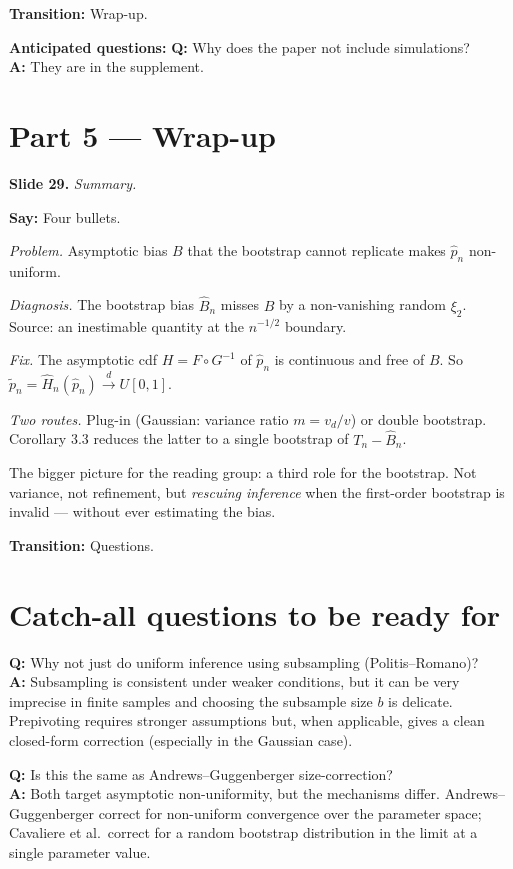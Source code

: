\documentclass[11pt]{article}
\theoremstyle{definition}
\newcommand{\dto}{\xrightarrow{d}}
\newcommand{\Tn}{T_{n}}
\newcommand{\Bnh}{\hat{B}_{n}}
\newcommand{\pnh}{\hat{p}_{n}}
\newcommand{\pnt}{\tilde{p}_{n}}
\newcommand{\Hnh}{\hat{H}_{n}}
\newcommand{\slide}[2]{%
  \medskip
  \noindent\colorbox{soft}{\parbox{\linewidth}{\textbf{Slide #1.} \textit{#2}}}
  \medskip
}
\newcommand{\say}[1]{\textbf{Say:} #1}
\newcommand{\trans}[1]{\textbf{Transition:} #1}
\newcommand{\Q}[2]{\noindent\textcolor{warn}{\textbf{Q:}} #1\\ \textcolor{accent}{\textbf{A:}} #2\par\smallskip}
\begin{document}
\trans{Wrap-up.}

\textbf{Anticipated questions:}
\Q{Why does the paper not include simulations?}
{They are in the supplement.}

\section{Part 5 --- Wrap-up}

\slide{29}{Summary.}
\say{Four bullets.

\emph{Problem.} Asymptotic bias $B$ that the bootstrap cannot replicate
makes $\pnh$ non-uniform.

\emph{Diagnosis.} The bootstrap bias $\Bnh$ misses $B$ by a non-vanishing random
$\xi_2$. Source: an inestimable quantity at the $n^{-1/2}$ boundary.

\emph{Fix.} The asymptotic cdf $H=F\circ G^{-1}$ of $\pnh$ is continuous and
free of $B$. So $\pnt=\Hnh(\pnh)\dto U[0,1]$.

\emph{Two routes.} Plug-in (Gaussian: variance ratio $m=v_d/v$) or double
bootstrap. Corollary 3.3 reduces the latter to a single bootstrap of
$\Tn-\Bnh$.

The bigger picture for the reading group: a third role for the bootstrap.
Not variance, not refinement, but \emph{rescuing inference} when the
first-order bootstrap is invalid --- without ever estimating the bias.}

\trans{Questions.}

\section{Catch-all questions to be ready for}

\Q{Why not just do uniform inference using subsampling (Politis--Romano)?}
{Subsampling is consistent under weaker conditions, but it can be very
imprecise in finite samples and choosing the subsample size $b$ is delicate.
Prepivoting requires stronger assumptions but, when applicable, gives a
clean closed-form correction (especially in the Gaussian case).}

\Q{Is this the same as Andrews--Guggenberger size-correction?}
{Both target asymptotic non-uniformity, but the mechanisms differ.
Andrews--Guggenberger correct for non-uniform convergence over the
parameter space; Cavaliere et al.\ correct for a random bootstrap distribution
in the limit at a single parameter value.}
\end{document}
